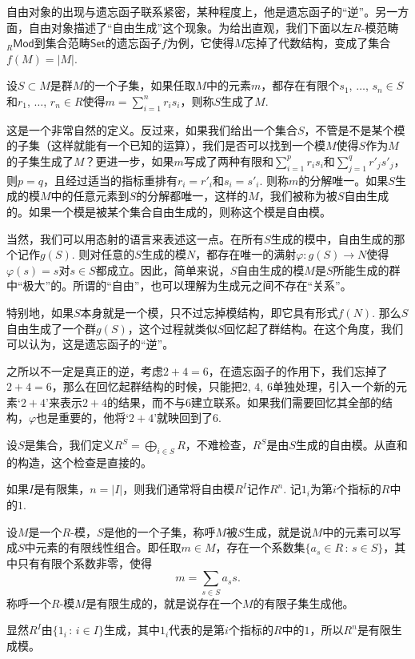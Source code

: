 
自由对象的出现与遗忘函子联系紧密，某种程度上，他是遗忘函子的“逆”。另一方面，自由对象描述了“自由生成”这个现象。为给出直观，我们下面以左$R$-模范畴${}_R\mathsf{Mod}$到集合范畴$\mathsf{Set}$的遗忘函子$f$为例，它使得$M$忘掉了代数结构，变成了集合$f(M)=|M|$. 

\begin{para}
设$S\subset M$是群$M$的一个子集，如果任取$M$中的元素$m$，都存在有限个$s_1$, $\dots$, $s_n\in S$和$r_1$, $\dots$, $r_n\in R$使得$m=\sum_{i=1}^n r_is_i$，则称$S$生成了$M$.
\end{para}

这是一个非常自然的定义。反过来，如果我们给出一个集合$S$，不管是不是某个模的子集（这样就能有一个已知的运算），我们是否可以找到一个模$M$使得$S$作为$M$的子集生成了$M$？更进一步，如果$m$写成了两种有限和$\sum_{i=1}^p r_is_i$和$\sum_{j=1}^q r'_js'_j$，则$p=q$，且经过适当的指标重排有$r_i=r'_i$和$s_i=s'_i$. 则称$m$的分解唯一。如果$S$生成的模$M$中的任意元素到$S$的分解都唯一，这样的$M$，我们被称为被$S$自由生成的。如果一个模是被某个集合自由生成的，则称这个模是自由模。

当然，我们可以用态射的语言来表述这一点。在所有$S$生成的模中，自由生成的那个记作$g(S)$. 则对任意的$S$生成的模$N$，都存在唯一的满射$\varphi:g(S)\to N$使得$\varphi(s)=s$对$s\in S$都成立。因此，简单来说，$S$自由生成的模$M$是$S$所能生成的群中“极大”的。所谓的“自由”，也可以理解为生成元之间不存在“关系”。

特别地，如果$S$本身就是一个模，只不过忘掉模结构，即它具有形式$f(N)$. 那么$S$自由生成了一个群$g(S)$，这个过程就类似$S$回忆起了群结构。在这个角度，我们可以认为，这是遗忘函子的“逆”。

之所以不一定是真正的逆，考虑$2+4=6$，在遗忘函子的作用下，我们忘掉了$2+4=6$，那么在回忆起群结构的时候，只能把$2$, $4$, $6$单独处理，引入一个新的元素`$2+4$'来表示$2+4$的结果，而不与$6$建立联系。如果我们需要回忆其全部的结构，$\varphi$也是重要的，他将`$2+4$'就映回到了$6$.

\begin{para}[自由模的存在性]
设$S$是集合，我们定义$R^S=\bigoplus_{i\in S}R$，不难检查，$R^S$是由$S$生成的自由模。从直和的构造，这个检查是直接的。

如果$I$是有限集，$n=|I|$，则我们通常将自由模$R^I$记作$R^n$. 记$1_i$为第$i$个指标的$R$中的$1$.
\end{para}

\begin{para}
设$M$是一个$R$-模，$S$是他的一个子集，称呼$M$被$S$生成，就是说$M$中的元素可以写成$S$中元素的有限线性组合。即任取$m\in M$，存在一个系数集$\{a_s\in R\,:\, s\in S\}$，其中只有有限个系数非零，使得
\[
	m=\sum_{s\in S}a_s s.
\]
称呼一个$R$-模$M$是有限生成的，就是说存在一个$M$的有限子集生成他。

显然$R^I$由$\{1_i\,:\,i\in I\}$生成，其中$1_i$代表的是第$i$个指标的$R$中的$1$，所以$R^n$是有限生成模。
\end{para}

